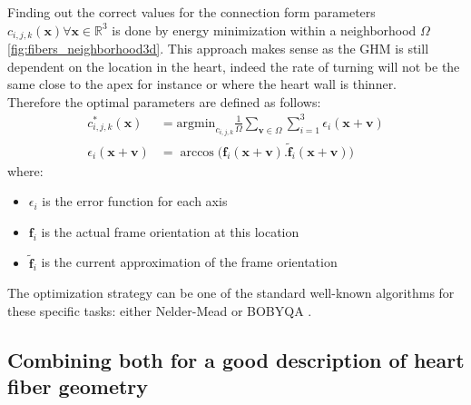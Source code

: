 Finding out the correct values for the connection form parameters $c_{i,j,k}(\mathbf{x}) \forall \mathbf{x} \in \mathbb{R}^3$ is done by energy minimization within a neighborhood $\Omega$ \ref{fig:fibers_neighborhood3d}. This approach makes sense as the GHM is still dependent on the location in the heart, indeed the rate of turning will not be the same close to the apex for instance or where the heart wall is thinner.\\
Therefore the optimal parameters are defined as follows:
\begin{align*}
    c^*_{i,j,k}(\mathbf{x}) &= \text{argmin}_{c_{i,j,k}} \frac{1}{\Omega} \sum_{\mathbf{v} \in \Omega} \sum_{i = 1}^3 \epsilon_i(\mathbf{x} + \mathbf{v}) \\
    \epsilon_i(\mathbf{x} + \mathbf{v}) &= \arccos \Big( \mathbf{f}_i(\mathbf{x} + \mathbf{v}) . \mathbf{\tilde{f}}_i(\mathbf{x} + \mathbf{v}) \Big)
\end{align*}
where:
\begin{itemize}
    \item $\epsilon_i$ is the error function for each axis 
    \item $\mathbf{f}_i$ is the actual frame orientation at this location
    \item $\mathbf{\tilde{f}}_i$ is the current approximation of the frame orientation
\end{itemize}
The optimization strategy can be one of the standard well-known algorithms for these specific tasks: either Nelder-Mead \cite{press2007numerical} or BOBYQA \cite{powell2009bobyqa}.

\subsection{Combining both for a good description of heart fiber geometry}

